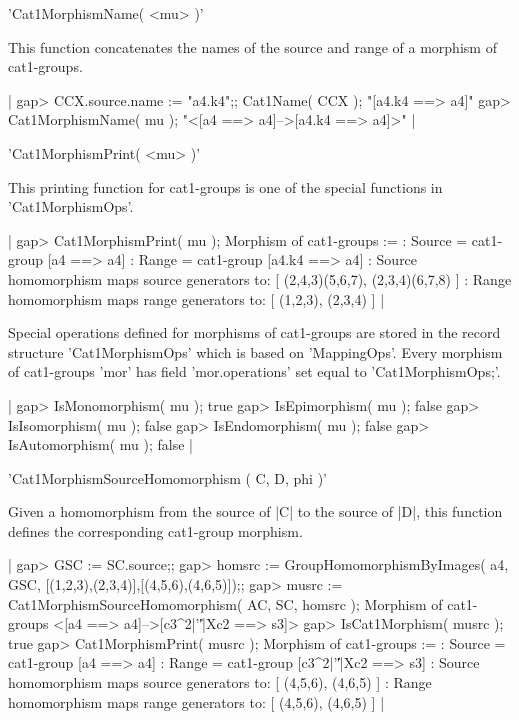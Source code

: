'Cat1MorphismName( <mu> )'

This function concatenates the names of the source and range of a morphism of
cat1-groups.

|    gap> CCX.source.name := "a4.k4";; Cat1Name( CCX );
    "[a4.k4 ==> a4]"
    gap> Cat1MorphismName( mu );
    "<[a4 ==> a4]-->[a4.k4 ==> a4]>"  |
    
%

'Cat1MorphismPrint( <mu> )'

This printing function for cat1-groups is one of the special functions
in 'Cat1MorphismOps'. 

|    gap> Cat1MorphismPrint( mu );
    Morphism of cat1-groups := 
    : Source = cat1-group [a4 ==> a4] 
    :  Range = cat1-group [a4.k4 ==> a4] 
    : Source homomorphism maps source generators to:
      [ (2,4,3)(5,6,7), (2,3,4)(6,7,8) ]
    : Range homomorphism maps range generators to:
      [ (1,2,3), (2,3,4) ]  |
   
%

Special operations defined for morphisms of cat1-groups are stored in 
the record structure 'Cat1MorphismOps' which is based on 'MappingOps'.
Every morphism of cat1-groups 'mor' has field 'mor.operations' 
set equal to 'Cat1MorphismOps;'.

|    gap> IsMonomorphism( mu );
    true
    gap> IsEpimorphism( mu );
    false
    gap> IsIsomorphism( mu );
    false
    gap> IsEndomorphism( mu );
    false
    gap> IsAutomorphism( mu );
    false   |

%

'Cat1MorphismSourceHomomorphism ( C, D, phi )'

Given a homomorphism from the source of |C| to
the source of |D|, this function defines the corresponding
cat1-group morphism.

|    gap> GSC := SC.source;;
    gap> homsrc := GroupHomomorphismByImages( a4, GSC,
                     [(1,2,3),(2,3,4)],[(4,5,6),(4,6,5)]);;
    gap> musrc := Cat1MorphismSourceHomomorphism( AC, SC, homsrc );
    Morphism of cat1-groups <[a4 ==> a4]-->[c3^2|'\|'|Xc2 ==> s3]>
    gap> IsCat1Morphism( musrc );
    true
    gap> Cat1MorphismPrint( musrc );
    Morphism of cat1-groups := 
    : Source = cat1-group [a4 ==> a4] 
    :  Range = cat1-group [c3^2|'\|'|Xc2 ==> s3] 
    : Source homomorphism maps source generators to:
       [ (4,5,6), (4,6,5) ]
    : Range homomorphism maps range generators to:
       [ (4,5,6), (4,6,5) ]  |

